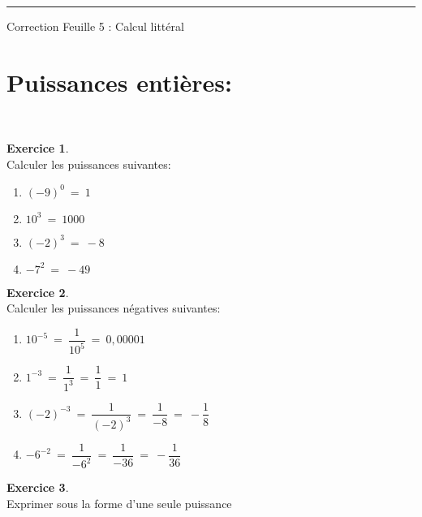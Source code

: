 \documentclass[10pt,a4paper]{article}
\theoremstyle{definition}
\theoremstyle{definition}
\newtheorem{exo}{Exercice}
\begin{document}
	
	\rule[0.5ex]{\textwidth}{0.1mm}	
	
	\begin{center}
		\large \sc Correction Feuille 5 : Calcul littéral  	
	\end{center}
\section*{Puissances entières:}\quad\\

\begin{center}
	\begin{minipage}[c]{0.4\linewidth}
		\raggedright
		\begin{exo}\quad\\
			Calculer les puissances suivantes:\hfill\textbf{}\\
			\begin{multicols}{2}
				\begin{enumerate}
					\item $(-9)^0 \ = \ 1$
					\item $10^3 \ = \ 1000$
				
					\item $(-2)^3 \ = \ -8$
					\item $-7^2 \ = \ -49$
					
				\end{enumerate}
			\end{multicols}
		\end{exo}
		\begin{exo}\quad\hfill\textbf{}\\
		Calculer les puissances négatives suivantes:
		
			\begin{enumerate}
				\item $10^{-5} \ = \ \dfrac{1}{10^5} \ = \ 0,00001$
				\item $1^{-3} \ = \ \dfrac{1}{1^3} \ = \ \dfrac{1}{1} \ = \ 1$
				
				\item $(-2)^{-3} \ = \ \dfrac{1}{(-2)^{3}} \ = \ \dfrac{1}{-8} \ = \ -\dfrac{1}{8}$
				\item $-6^{-2} \ = \ \dfrac{1}{-6^2} \ = \ \dfrac{1}{-36} \ = \ -\dfrac{1}{36}$
			\end{enumerate}
	
	\end{exo}
	\begin{exo}\quad\hfill\textbf{}\\
		Exprimer sous la forme d'une seule puissance
		

\end{exo}
\end{minipage}
\end{center}
\end{document}
